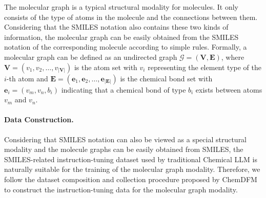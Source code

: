 The molecular graph is a typical structural modality for molecules. It only consists of the type of atoms in the molecule and the connections between them. Considering that the SMILES notation also contains these two kinds of information, the molecular graph can be easily obtained from the SMILES notation of the corresponding molecule according to simple rules. Formally, a molecular graph can be defined as an undirected graph $\mathcal{G} = (\mathbf{V}, \mathbf{E})$, where $\mathbf{V} = (v_1, v_2, \dots, v_{|\mathbf{V}|})$ is the atom set with $v_i$ representing the element type of the $i$-th atom and $\mathbf{E} = (\boldsymbol{e}_1, \boldsymbol{e}_2, \dots, \boldsymbol{e}_{|\mathbf{E}|})$ is the chemical bond set with $\boldsymbol{e}_i=(v_m, v_n, b_i)$ indicating that a chemical bond of type $b_i$ exists between atoms $v_m$ and $v_n$.

\paragraph{Data Construction.}
Considering that SMILES notation can also be viewed as a special structural modality and the molecule graphs can be easily obtained from SMILES, the SMILES-related instruction-tuning dataset used by traditional Chemical LLM is naturally suitable for the training of the molecular graph modality. Therefore, we follow the dataset composition and collection procedure proposed by ChemDFM~\cite{zhao2024chemdfm} to construct the instruction-tuning data for the molecular graph modality.

